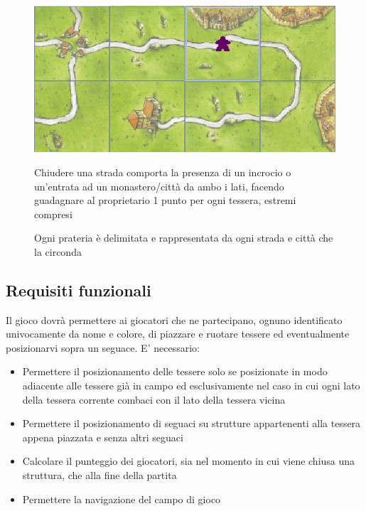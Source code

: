 \begin{figure}[hb]
    {\includegraphics[]{images/StradaMeeple.png}}

    \caption{Chiudere una strada comporta la presenza di un incrocio o un’entrata ad un monastero/città da ambo i lati, facendo guadagnare al proprietario 1 punto per ogni tessera, estremi compresi}
\end{figure}

\begin{figure}[hb]

    \caption{Ogni prateria è delimitata e rappresentata da ogni strada e città che la circonda}
    
\end{figure}

\subsection*{Requisiti funzionali}
Il gioco dovrà permettere ai giocatori che ne partecipano, ognuno identificato univocamente da nome e colore, di piazzare e ruotare tessere ed eventualmente posizionarvi sopra un seguace. E' necessario:

\begin{itemize}
\item Permettere il posizionamento delle tessere solo se posizionate in modo adiacente alle tessere già in campo ed esclusivamente nel caso in cui ogni lato della tessera corrente combaci con il lato della tessera vicina
\item Permettere il posizionamento di seguaci su strutture appartenenti alla tessera appena piazzata e senza altri seguaci
\item Calcolare il punteggio dei giocatori, sia nel momento in cui viene chiusa una struttura, che alla fine della partita
\item Permettere la navigazione del campo di gioco
\end{itemize}

